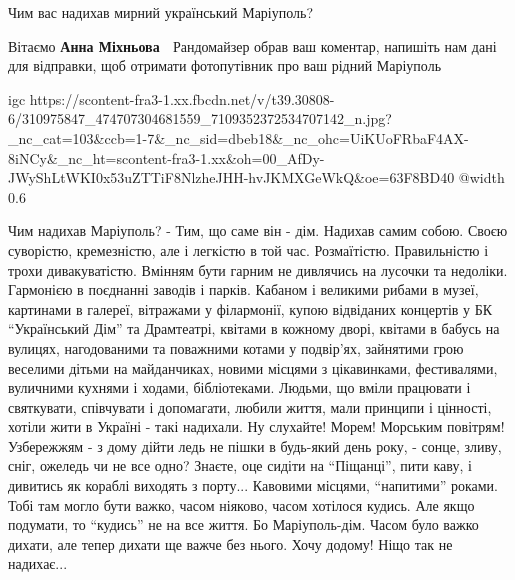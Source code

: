  
 
 
 
 

\qqSecCmt


Чим вас надихав мирний український Маріуполь?


Вітаємо \textbf{Анна Міхньова} 💛 Рандомайзер обрав ваш коментар, напишіть нам дані для
відправки, щоб отримати фотопутівник про ваш рідний Маріуполь

\ifcmt
  igc https://scontent-fra3-1.xx.fbcdn.net/v/t39.30808-6/310975847_474707304681559_7109352372534707142_n.jpg?_nc_cat=103&ccb=1-7&_nc_sid=dbeb18&_nc_ohc=UiKUoFRbaF4AX-8iNCy&_nc_ht=scontent-fra3-1.xx&oh=00_AfDy-JWyShLtWKI0x53uZTTiF8NlzheJHH-hvJKMXGeWkQ&oe=63F8BD40
	@width 0.6
\fi


Чим надихав Маріуполь? - Тим, що саме він - дім. Надихав самим собою. Своєю
суворістю, кремезністю, але і легкістю в той час. Розмаїтістю. Правильністю і
трохи дивакуватістю. Вмінням бути гарним не дивлячись на лусочки та недоліки.
Гармонією в поєднанні заводів і парків. Кабаном і великими рибами в музеї,
картинами в галереї, вітражами у філармонії, купою відвіданих концертів у БК
\enquote{Український Дім} та Драмтеатрі, квітами в кожному дворі, квітами в бабусь на
вулицях, нагодованими та поважними котами у подвір'ях, зайнятими грою веселими
дітьми на майданчиках, новими місцями з цікавинками, фестивалями, вуличними
кухнями і ходами, бібліотеками. Людьми, що вміли працювати і святкувати,
співчувати і допомагати, любили життя, мали принципи і цінності, хотіли жити в
Україні - такі надихали. Ну слухайте! Морем! Морським повітрям!Узбережжям - з
дому дійти ледь не пішки в будь-який день року, - сонце, зливу, сніг, ожеледь
чи не все одно? Знаєте, оце сидіти на \enquote{Піщанці}, пити каву, і дивитись як
кораблі виходять з порту... Кавовими місцями, \enquote{напитими} роками. Тобі там могло
бути важко, часом ніяково, часом хотілося кудись. Але якщо подумати, то
\enquote{кудись} не на все життя. Бо Маріуполь-дім. Часом було важко дихати, але тепер
дихати ще важче без нього. Хочу додому! Ніщо так не надихає...


